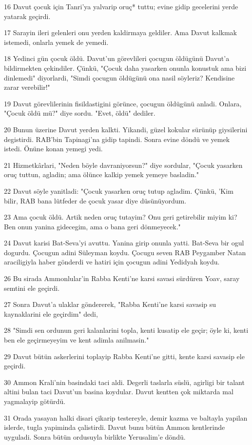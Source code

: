 \par 16 Davut çocuk için Tanri'ya yalvarip oruç* tuttu; evine gidip gecelerini yerde yatarak geçirdi.
\par 17 Sarayin ileri gelenleri onu yerden kaldirmaya geldiler. Ama Davut kalkmak istemedi, onlarla yemek de yemedi.
\par 18 Yedinci gün çocuk öldü. Davut'un görevlileri çocugun öldügünü Davut'a bildirmekten çekindiler. Çünkü, "Çocuk daha yasarken onunla konustuk ama bizi dinlemedi" diyorlardi, "Simdi çocugun öldügünü ona nasil söyleriz? Kendisine zarar verebilir!"
\par 19 Davut görevlilerinin fisildastigini görünce, çocugun öldügünü anladi. Onlara, "Çocuk öldü mü?" diye sordu. "Evet, öldü" dediler.
\par 20 Bunun üzerine Davut yerden kalkti. Yikandi, güzel kokular sürünüp giysilerini degistirdi. RAB'bin Tapinagi'na gidip tapindi. Sonra evine döndü ve yemek istedi. Önüne konan yemegi yedi.
\par 21 Hizmetkârlari, "Neden böyle davraniyorsun?" diye sordular, "Çocuk yasarken oruç tuttun, agladin; ama ölünce kalkip yemek yemeye basladin."
\par 22 Davut söyle yanitladi: "Çocuk yasarken oruç tutup agladim. Çünkü, 'Kim bilir, RAB bana lütfeder de çocuk yasar diye düsünüyordum.
\par 23 Ama çocuk öldü. Artik neden oruç tutayim? Onu geri getirebilir miyim ki? Ben onun yanina gidecegim, ama o bana geri dönmeyecek."
\par 24 Davut karisi Bat-Seva'yi avuttu. Yanina girip onunla yatti. Bat-Seva bir ogul dogurdu. Çocugun adini Süleyman koydu. Çocugu seven RAB Peygamber Natan araciligiyla haber gönderdi ve hatiri için çocugun adini Yedidyah koydu.
\par 26 Bu sirada Ammonlular'in Rabba Kenti'ne karsi savasi sürdüren Yoav, saray semtini ele geçirdi.
\par 27 Sonra Davut'a ulaklar göndererek, "Rabba Kenti'ne karsi savasip su kaynaklarini ele geçirdim" dedi,
\par 28 "Simdi sen ordunun geri kalanlarini topla, kenti kusatip ele geçir; öyle ki, kenti ben ele geçirmeyeyim ve kent adimla anilmasin."
\par 29 Davut bütün askerlerini toplayip Rabba Kenti'ne gitti, kente karsi savasip ele geçirdi.
\par 30 Ammon Krali'nin basindaki taci aldi. Degerli taslarla süslü, agirligi bir talant altini bulan taci Davut'un basina koydular. Davut kentten çok miktarda mal yagmalayip götürdü.
\par 31 Orada yasayan halki disari çikarip testereyle, demir kazma ve baltayla yapilan islerde, tugla yapiminda çalistirdi. Davut bunu bütün Ammon kentlerinde uyguladi. Sonra bütün ordusuyla birlikte Yerusalim'e döndü.

